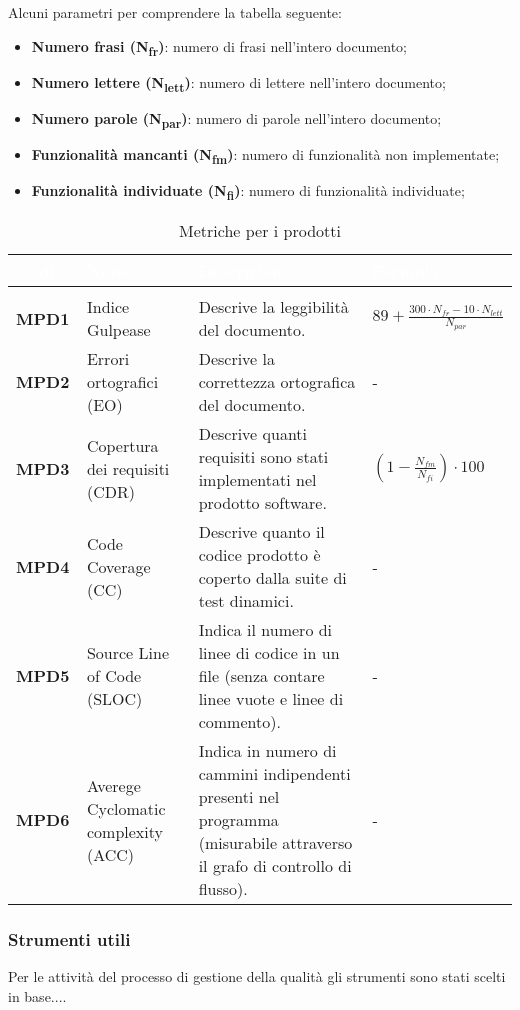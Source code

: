 Alcuni parametri per comprendere la tabella seguente:
\begin{itemize}
	\item \textbf{Numero frasi (N\textsubscript{fr})}: numero di frasi nell'intero documento;
	\item \textbf{Numero lettere (N\textsubscript{lett})}: numero di lettere nell'intero documento;
	\item \textbf{Numero parole (N\textsubscript{par})}: numero di parole nell'intero documento;
	\item \textbf{Funzionalità mancanti (N\textsubscript{fm})}: numero di funzionalità non implementate;
	\item \textbf{Funzionalità individuate (N\textsubscript{fi})}: numero di funzionalità individuate;
\end{itemize}

\renewcommand{\arraystretch}{1.5}
\renewcommand\extrarowheight{1.5pt}
\begin{longtable}{C{1.5cm} | C{4.5cm} C{5.5cm} C{5cm}}
		\textcolor{white}{\textbf{Codice}} & 
		\textcolor{white}{\textbf{Nome}} & 
		\textcolor{white}{\textbf{Descrizione}} & 
		\textcolor{white}{\textbf{Formula}} \\
		\endfirsthead
		\\
	    \endfoot
	    \caption{Metriche per i prodotti}
	    \endlastfoot
		\hline
		\textbf{MPD1} & 
		Indice Gulpease & 
		Descrive la leggibilità del documento. & 
		$ 89 + \frac{300 \cdot N_{fr} - 10 \cdot N_{lett}}{N_{par}}$ \\
		\textbf{MPD2} & 
		Errori ortografici (EO) & 
		Descrive la correttezza ortografica del documento. & 
		- \\
		\textbf{MPD3} & 
		Copertura dei requisiti (CDR) & 
		Descrive quanti requisiti sono stati implementati nel prodotto software. &
		$(1 - \frac{N_{fm}}{N_{fi}}) \cdot 100 $ \\
		\textbf{MPD4} & 
		Code Coverage (CC) & 
		Descrive quanto il codice prodotto è coperto dalla suite di test dinamici. &
		- \\
		\textbf{MPD5} & 
		Source Line of Code (SLOC) & 
		Indica il numero di linee di codice in un file (senza contare linee vuote e linee di commento). &
		- \\
		\textbf{MPD6} & 
		Averege Cyclomatic complexity (ACC) & 
		Indica in numero di cammini indipendenti presenti nel programma (misurabile attraverso il grafo di controllo di flusso). &
		- \\
\end{longtable}

\subsubsection{Strumenti utili}
Per le attività del processo di gestione della qualità gli strumenti sono stati scelti in base.... 

 

  
